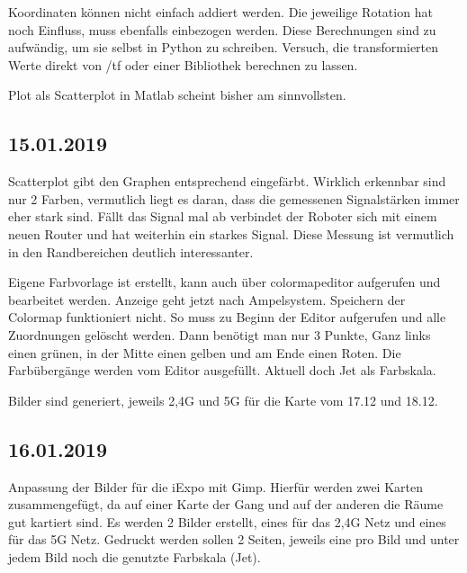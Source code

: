 \documentclass{scrartcl}%
\begin{document}
Koordinaten können nicht einfach addiert werden. Die jeweilige Rotation hat noch Einfluss, muss ebenfalls einbezogen werden. Diese Berechnungen sind zu aufwändig, um sie selbst in Python zu schreiben. Versuch, die transformierten Werte direkt von /tf oder einer Bibliothek berechnen zu lassen.

Plot als Scatterplot in Matlab scheint bisher am sinnvollsten.

\subsection{15.01.2019}
Scatterplot gibt den Graphen entsprechend eingefärbt. Wirklich erkennbar sind nur 2 Farben, vermutlich liegt es daran, dass die gemessenen Signalstärken immer eher stark sind. Fällt das Signal mal ab verbindet der Roboter sich mit einem neuen Router und hat weiterhin ein starkes Signal. Diese Messung ist vermutlich in den Randbereichen deutlich interessanter.

Eigene Farbvorlage ist erstellt, kann auch über colormapeditor aufgerufen und bearbeitet werden. Anzeige geht jetzt nach Ampelsystem. Speichern der Colormap funktioniert nicht. So muss zu Beginn der Editor aufgerufen und alle Zuordnungen gelöscht werden. Dann benötigt man nur 3 Punkte, Ganz links einen grünen, in der Mitte einen gelben und am Ende einen Roten. Die Farbübergänge werden vom Editor ausgefüllt. Aktuell doch Jet als Farbskala.

Bilder sind generiert, jeweils 2,4G und 5G für die Karte vom 17.12 und 18.12.

\subsection{16.01.2019}
Anpassung der Bilder für die iExpo mit Gimp. Hierfür werden zwei Karten zusammengefügt, da auf einer Karte der Gang und auf der anderen die Räume gut kartiert sind. Es werden 2 Bilder erstellt, eines für das 2,4G Netz und eines für das 5G Netz. Gedruckt werden sollen 2 Seiten, jeweils eine pro Bild und unter jedem Bild noch die genutzte Farbskala (Jet).
\end{document}
